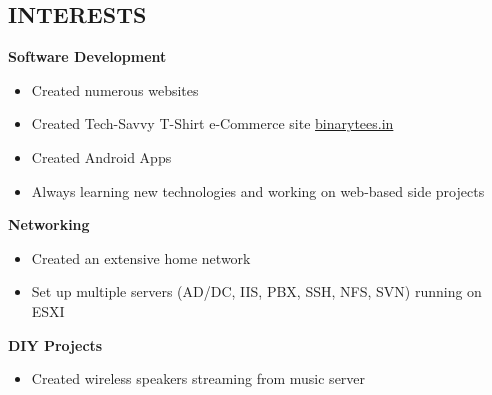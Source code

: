 \documentclass[line, margin]{res}
\begin{document}
\begin{resume}
\section{INTERESTS}
\textbf{Software Development}
\begin{itemize}[leftmargin=10pt]
\item Created numerous websites
\item Created Tech-Savvy T-Shirt e-Commerce site \href{https://binarytees.in}{binarytees.in}
\item Created Android Apps
\item Always learning new technologies and working on web-based side projects
\end{itemize}
\textbf{Networking}
\begin{itemize}[leftmargin=10pt]
\item Created an extensive home network
\item Set up multiple servers (AD/DC, IIS, PBX, SSH, NFS, SVN) running on ESXI
\end{itemize}
\textbf{DIY Projects}
\begin{itemize}[leftmargin=10pt]
\item Created wireless speakers streaming from music server
\end{itemize}
\end{resume}
\end{document}
